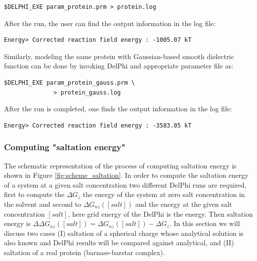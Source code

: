 \documentclass[9pt,tutorial]{livecoms}
\begin{document}
\begin{verbatim}
$DELPHI_EXE param_protein.prm > protein.log
\end{verbatim}

After the run, the user can find the output information in the log file: 

\begin{verbatim}
Energy> Corrected reaction field energy : -1005.07 kT
\end{verbatim}

Similarly, modeling the same protein with Gaussian-based smooth dielectric function can be done by invoking DelPhi and appropriate parameter file as:

\begin{verbatim}
$DELPHI_EXE param_protein_gauss.prm \
              > protein_gauss.log
\end{verbatim}

After the run is completed, one finds the output information in the log file: 

\begin{verbatim}
Energy> Corrected reaction field energy : -3583.05 kT
\end{verbatim}

\subsubsection{Computing "saltation energy"}

The schematic representation of the process of computing saltation energy is shown in Figure \ref{fig:scheme_saltation}. In order to compute the saltation energy of a system at a given salt concentration two different DelPhi runs are required, first to compute the $ \Delta G_{z} $ the energy of the system at zero salt concentration in the solvent and second to $ \Delta G_{nz}([salt]) $ and the energy at the given salt concentration $[salt]$, here grid energy of the DelPhi is the energy. Then saltation energy is $ \Delta\Delta G_{nz}([salt]) = \Delta G_{nz}([salt]) - \Delta G_{z}$. In this section we will discuss two cases (I) saltation of a spherical charge whose analytical solution is also known and DelPhi results will be compared against analytical, and (II) saltation of a real protein (barnase-barstar complex).
\end{document}
